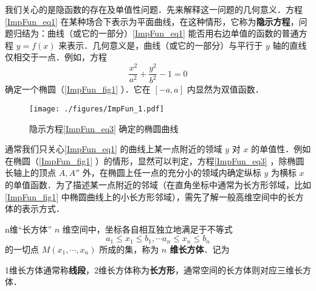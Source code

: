 我们关心的是隐函数的存在及单值性问题．先来解释这一问题的几何意义．方程\autoref{ImpFun_eq1} 在某种场合下表示为平面曲线，在这种情形，它称为\textbf{隐示方程}，问题归结为：曲线（或它的一部分）\autoref{ImpFun_eq1} 能否用右边单值的函数的普通方程 $y=f(x)$ 来表示．几何意义是，曲线（或它的一部分）与平行于 $y$ 轴的直线仅相交于一点．例如，方程 
\begin{equation}\label{ImpFun_eq3}
\frac{x^2}{a^2}+\frac{y^2}{b^2}-1=0
\end{equation}
确定一个椭圆（\autoref{ImpFun_fig1} ）．它在 $[-a,a]$ 内显然为双值函数．
\begin{figure}[ht]
\centering
\texttt{[image: ./figures/ImpFun\_1.pdf]}
\caption{隐示方程\autoref{ImpFun_eq3} 确定的椭圆曲线} \label{ImpFun_fig1}
\end{figure}
通常我们只关心\autoref{ImpFun_eq1} 的曲线上某一点附近的领域 $y$ 对 $x$ 的单值性．例如在椭圆（\autoref{ImpFun_fig1} ）的情形，显然可以判定，方程\autoref{ImpFun_eq3} ，除椭圆长轴上的顶点 $A,A''$ 外，在椭圆上任一点的充分小的领域内确定纵标 $y$ 为横标 $x$ 的单值函数．为了描述某一点附近的邻域（在直角坐标中通常为长方形邻域，比如\autoref{ImpFun_fig1} 中椭圆曲线上的小长方形邻域），需先了解一般高维空间中的长方体的表示方式．
\begin{definition}{n维“长方体”}
$n$ 维空间中，坐标各自相互独立地满足于不等式
\begin{equation}
a_1\leq x_1\leq b_1,\cdots a_n\leq x_n\leq b_n
\end{equation}
的一切点 $M(x_1,\cdots,x_n)$ 所成的集，称为\textbf{ $n$ 维长方体}．记为
\begin{equation}
[a_1,b_1;\cdots;a_n,b_n]
\end{equation}

\end{definition}
1维长方体通常称\textbf{线段}，2维长方体称为\textbf{长方形}，通常空间的长方体则对应三维长方体．